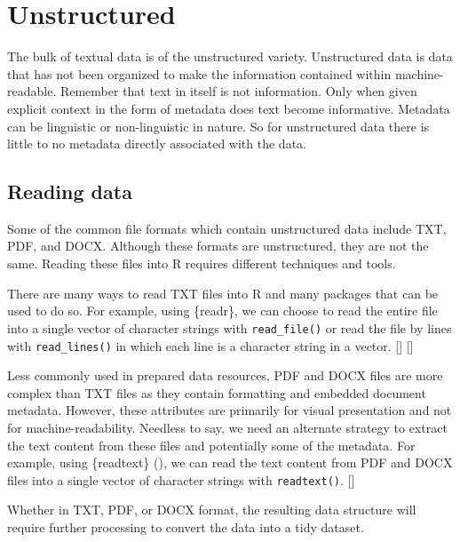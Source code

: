 \documentclass[
  letterpaper,
  krantz1]{latex/krantz-mod}
\newcommand{\cindex}[1]{%
  \StrSubstitute{#1}{_}{\_}[\temp]%
  \index{\temp}%
}
\theoremstyle{definition}
\theoremstyle{definition}
\theoremstyle{remark}
\begin{document}
\section{Unstructured}\label{sec-unstructured}

The bulk of textual data is of the unstructured variety. Unstructured
data is data that has not been organized to make the information
contained within machine-readable. Remember
that text in itself is not information. Only when
given explicit context in the form of metadata does text become
informative. Metadata can be linguistic or non-linguistic in
nature. So for unstructured data there is little to no
metadata directly associated with the data.

\subsection{Reading data}\label{reading-data}

Some of the common file formats which contain unstructured data include
TXT, PDF, and
DOCX. Although these formats are
unstructured, they are not the same. Reading these files into R requires
different techniques and tools.

There are many ways to read TXT files into R and many packages that can
be used to do so. For example, using \{readr\},
we can choose to read the entire file into a single vector of character
strings with \texttt{read\_file()} or read the file by lines with
\texttt{read\_lines()} in which each line is a character string in a
vector.\cindex{read_file()}\cindex{read_lines()}

Less commonly used in prepared data resources, PDF and DOCX files are
more complex than TXT files as they contain formatting and embedded
document metadata. However, these attributes are primarily for visual
presentation and not for machine-readability. Needless to say, we need
an alternate strategy to extract the text content from these files and
potentially some of the metadata. For example, using \{readtext\}
(), we can read the text content from PDF
and DOCX files into a single vector of character strings with
\texttt{readtext()}.\cindex{readtext()}

Whether in TXT, PDF, or DOCX format, the resulting data structure will
require further processing to convert the data into a tidy dataset.
\end{document}
